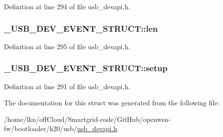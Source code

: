 Definition at line 294 of file usb\+\_\+devapi.\+h.

\subsubsection[{\texorpdfstring{len}{len}}]{ \+\_\+\+U\+S\+B\+\_\+\+D\+E\+V\+\_\+\+E\+V\+E\+N\+T\+\_\+\+S\+T\+R\+U\+C\+T\+::len}\hypertarget{struct___u_s_b___d_e_v___e_v_e_n_t___s_t_r_u_c_t_a45a1bf1a753b59a66d6573c3762c98c3}{}\label{struct___u_s_b___d_e_v___e_v_e_n_t___s_t_r_u_c_t_a45a1bf1a753b59a66d6573c3762c98c3}


Definition at line 295 of file usb\+\_\+devapi.\+h.

\subsubsection[{\texorpdfstring{setup}{setup}}]{ \+\_\+\+U\+S\+B\+\_\+\+D\+E\+V\+\_\+\+E\+V\+E\+N\+T\+\_\+\+S\+T\+R\+U\+C\+T\+::setup}\hypertarget{struct___u_s_b___d_e_v___e_v_e_n_t___s_t_r_u_c_t_a0054be8f64b8700f301fd236eda4aa6f}{}\label{struct___u_s_b___d_e_v___e_v_e_n_t___s_t_r_u_c_t_a0054be8f64b8700f301fd236eda4aa6f}


Definition at line 291 of file usb\+\_\+devapi.\+h.



The documentation for this struct was generated from the following file\+:\begin{DoxyCompactItemize}
\item 
/home/lkn/off\+Cloud/\+Smartgrid-\/code/\+Git\+Hub/openwsn-\/fw/bootloader/k20/usb/\hyperlink{usb__devapi_8h}{usb\+\_\+devapi.\+h}\end{DoxyCompactItemize}
